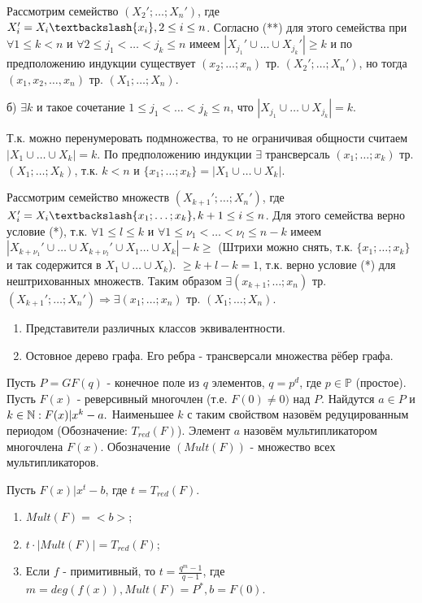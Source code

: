 Рассмотрим семейство $(X_2'; \dots; X_n')$, где $X_i'=X_i \textbackslash \{x_i\}, 2 \leq i \leq n$.
Согласно (**) для этого семейства при $\forall 1 \leq k < n$ и $\forall 2 \leq j_1 < \dots < j_k \leq n$ имеем $|X_{j_1}' \cup \dots \cup X_{j_k}'| \geq k$ и по предположению индукции существует $(x_2; \dots; x_n)$ тр. $(X_2'; \dots; X_n')$, но тогда $(x_1, x_2, \dots, x_n)$ тр. $(X_1; \dots; X_n)$.

б) $\exists k$ и такое сочетание $1 \leq j_1 < \dots < j_k \leq n$, что $|X_{j_1} \cup \dots \cup X_{j_k}|=k$.

Т.к. можно перенумеровать подмножества, то не ограничивая общности считаем $|X_1 \cup \dots \cup X_k|=k$. По предположению индукции $\exists$ трансверсаль $(x_1; \dots; x_k)$ тр. $(X_1; \dots; X_k)$, т.к. $k<n$ и $\{x_1;\dots;x_k\}=|X_1 \cup \dots \cup X_k|$.

Рассмотрим семейство множеств $(X_{k+1}'; \dots; X_n')$, где $X_i'=X_i \textbackslash \{x_1;\dots;x_k\}, k+1 \leq i \leq n$. Для этого семейства верно условие (*), т.к. $\forall 1 \leq l \leq k$ и $\forall 1 \leq \nu_1 < \dots < \nu_l \leq n-k$ имеем $|X_{k+{\nu_1}}' \cup \dots \cup X_{k+{\nu_l}}' \cup X_1 \dots \cup X_k|-k\geq$
(Штрихи можно снять, т.к. $\{x_1; \dots; x_k\}$ и так содержится в $X_1 \cup \dots \cup X_k$).
$\geq k+l-k=1$, т.к. верно условие (*) для нештрихованных множеств. Таким образом $\exists  (x_{k+1}; \dots; x_n)$ тр. $(X_{k+1}'; \dots; X_n') \Rightarrow \exists (x_1; \dots; x_n)$ тр. $(X_1; \dots; X_n)$.\\

\examplei
\begin{enumerate}
    \item Представители различных классов эквивалентности.
    \item Остовное дерево графа. Его ребра - трансверсали множества рёбер графа.
\end{enumerate}

\opr Пусть $P=GF(q)$ - конечное поле из $q$ элементов, $q=p^d$, где $p \in \mathbb{P}$ (простое). Пусть $F(x)$ - реверсивный многочлен (т.е. $F(0) \neq 0 )$ над $P$. Найдутся $a \in P$ и $k \in \mathbb{N} : F(x)| x^k - a.$ Наименьшее $k$ с таким свойством назовём редуцированным периодом (Обозначение: $T_{red}(F)$). Элемент $a$ назовём мультипликатором многочлена $F(x)$. Обозначение $(Mult(F))$ - множество всех мультипликаторов.

Пусть $F(x)|x^t - b$, где $t = T_{red}(F)$.

\utv
\begin{enumerate}
\item $Mult(F) = <b>$;
\item $t \cdot |Mult(F)|=T_{red}(F)$;
\item  Если $f$ - примитивный, то $t= \frac{q^m - 1}{q-1}$, где $m=deg(f(x)), Mult(F)=P^*, b=F(0)$.
\end{enumerate}

